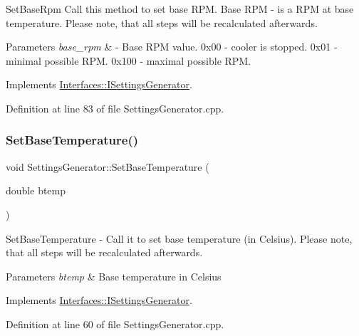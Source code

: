 Set\+Base\+Rpm Call this method to set base R\+PM. Base R\+PM -\/ is a R\+PM at base temperature. Please note, that all steps will be recalculated afterwards. 


\begin{DoxyParams}{Parameters}
{\em base\+\_\+rpm} & -\/ Base R\+PM value. 0x00 -\/ cooler is stopped. 0x01 -\/ minimal possible R\+PM. 0x100 -\/ maximal possible R\+PM. \\
\hline
\end{DoxyParams}


Implements \hyperlink{class_interfaces_1_1_i_settings_generator_a4caf07447d0930440d9f21318892244c}{Interfaces\+::\+I\+Settings\+Generator}.



Definition at line 83 of file Settings\+Generator.\+cpp.

\mbox{\label{class_settings_generator_aed9e7acb30bfd559b1ac70ceeddd8973}} 
\subsubsection{\texorpdfstring{Set\+Base\+Temperature()}{SetBaseTemperature()}}
{\footnotesize\ttfamily void Settings\+Generator\+::\+Set\+Base\+Temperature (\begin{DoxyParamCaption}\item[{double}]{btemp }\end{DoxyParamCaption})\hspace{0.3cm}{\ttfamily [virtual]}}



Set\+Base\+Temperature -\/ Call it to set base temperature (in Celsius). Please note, that all steps will be recalculated afterwards. 


\begin{DoxyParams}{Parameters}
{\em btemp} & Base temperature in Celsius \\
\hline
\end{DoxyParams}


Implements \hyperlink{class_interfaces_1_1_i_settings_generator_a8b60ba05790994db0303b251f655e95d}{Interfaces\+::\+I\+Settings\+Generator}.



Definition at line 60 of file Settings\+Generator.\+cpp.

